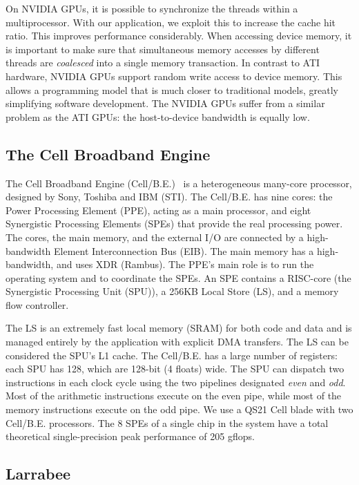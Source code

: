 \documentclass{article}
\begin{document}
On NVIDIA GPUs, it is possible to synchronize the threads within a
multiprocessor.  With our application, we exploit this to increase the
cache hit ratio. This improves performance considerably.  When
accessing device memory, it is important to make sure that
simultaneous memory accesses by different threads are \emph{coalesced}
into a single memory transaction.  In contrast to ATI hardware, NVIDIA
GPUs support random write access to device memory. This allows a
programming model that is much closer to traditional models, greatly
simplifying software development.  The NVIDIA GPUs suffer from a
similar problem as the ATI GPUs: the host-to-device bandwidth is
equally low.



\subsection{The Cell Broadband Engine}

The Cell Broadband Engine (\mbox{Cell/B.E.})~\cite{cell} is a
heterogeneous many-core processor, designed by Sony, Toshiba and IBM
(STI).  The \mbox{Cell/B.E.} has nine cores: the Power Processing
Element (PPE), acting as a main processor, and eight Synergistic
Processing Elements (SPEs) that provide the real processing power.
The cores, the main memory, and the external I/O are connected by a
high-bandwidth Element Interconnection Bus (EIB).  The main memory has
a high-bandwidth, and uses XDR (Rambus).  The PPE's main role is to
run the operating system and to coordinate the SPEs.  An SPE contains
a RISC-core (the Synergistic Processing Unit (SPU)), a 256KB Local
Store (LS), and a memory flow controller.

The LS is an extremely fast local memory (SRAM) for both code and data
and is managed entirely by the application with explicit DMA
transfers.  The LS can be considered the SPU's L1 cache.  The
\mbox{Cell/B.E.} has a large number of registers: each SPU has 128,
which are 128-bit (4 floats) wide.  The SPU can dispatch two
instructions in each clock cycle using the two pipelines designated
\emph{even} and \emph{odd}. Most of the arithmetic instructions
execute on the even pipe, while most of the memory instructions
execute on the odd pipe.  We use a QS21 Cell blade with two
\mbox{Cell/B.E.} processors.  The 8 SPEs of a single chip in the
system have a total theoretical single-precision peak performance of
205 gflops.

\subsection{Larrabee}
\end{document}
